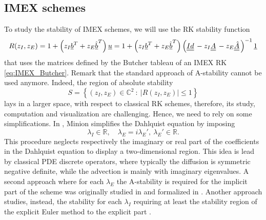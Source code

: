 \subsection{IMEX schemes}
To study the stability of IMEX schemes, we will use the RK stability function 
\begin{equation}\label{eq:ImExStabilityFunction}
R(z_I, z_E)=1+\left(z_I\vec{b}^T+z_E\vec{\hat{b}}^T\right)\vec{u}=1+\left(z_I\vec{b}^T+z_E\vec{\hat{b}}^T\right)\left(\mat{Id}-z_I\mat{A}-z_E\mat{\hat{A}}\right)^{-1} \vec{1}
\end{equation}
that uses the matrices defined by the Butcher tableau of an IMEX RK \eqref{eq:IMEX_Butcher}.
Remark that the standard approach of A-stability cannot be used anymore.
Indeed, the region of absolute stability $$S=\left\{(z_I,z_E)\in \mathbb{C}^2 \ : \ \lvert{R(z_I,z_E)}\rvert\le1\right\}$$ lays in a larger space, with respect to classical RK schemes, therefore, its study, computation and visualization are challenging.
Hence, we need to rely on some simplifications.
In \cite{minion2003dec}, Minion simplifies the Dahlquist equation by imposing
\begin{equation*}
\lambda_I \in \mathbb{R}, \quad \lambda_E =i\lambda_E', \ \lambda_E' \in \mathbb{R}.
\end{equation*} 
This procedure neglects respectively the imaginary or real part of the coefficients in the Dahlquist equation to display a two-dimensional region. This idea is lead by classical PDE discrete operators, where typically the diffusion is symmetric negative definite, while the advection is mainly with imaginary eigenvalues. 
A second approach where for each $\lambda_E$ the A-stability is required for the implicit part of the scheme was originally studied in \cite{zhong1996additive,caflisch1997uniformly} and formalized in \cite{liotta2000central}. Another approach studies, instead, the stability for each $\lambda_I$ requiring at least the stability region of the explicit Euler method to the explicit part \cite{Hundsdorfer}.
